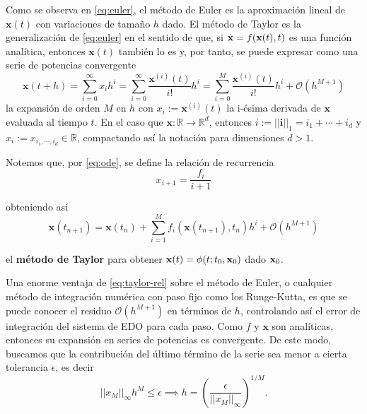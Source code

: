Como se observa en \ref{eq:euler}, el método de Euler es la aproximación lineal de $\mathbf{x}(t)$ con variaciones de tamaño $h$ dado. El método de Taylor es la generalización de \ref{eq:euler} en el sentido de que, si $\dot{\mathbf{x}} = f(\mathbf{x}(t),t)$ es una función analítica, entonces $\mathbf{x}(t)$ también lo es y, por tanto, se puede expresar como una serie de potencias convergente 
\begin{equation}
\mathbf{x}(t + h) = \sum_{i=0}^\infty x_i h^i = \sum_{i=0}^\infty \frac{\mathbf{x}^{(i)}(t)}{i!}h^i 
= \sum_{i=0}^M \frac{\mathbf{x}^{(i)}(t)}{i!}h^i + \mathcal{O}(h^{M+1})
\label{eq:anal-exp}
\end{equation}
la expansión de orden $M$ en $h$ con $x_i := \mathbf{x}^{(i)}(t)$ la i-ésima derivada de $\mathbf{x}$ evaluada al tiempo $t$. En el caso que $\mathbf{x}: \mathbb{R} \to \mathbb{R}^d$, entonces $i := ||\mathbf{i}||_1 = i_1 + \cdots + i_d$ y $x_i := x_{i_1,\cdots,i_d} \in \mathbb{R}$, compactando así la notación para dimensiones $d > 1$.

Notemos que, por \ref{eq:ode}, se define la relación de recurrencia
\begin{equation}
x_{i+1} = \frac{f_i}{i+1}
\label{eq:rec-rel}
\end{equation}

obteniendo así 
\begin{equation}
\mathbf{x}(t_{n+1}) = \mathbf{x}(t_n) + \sum_{i=1}^M f_i(\mathbf{x}(t_{n+1}),t_n)h^i + \mathcal{O}(h^{M+1})
\label{eq:taylor-rel}
\end{equation}

el \textbf{método de Taylor} para obtener $\mathbf{x}(t) = \phi(t;t_0,\mathbf{x}_0)$ dado $\mathbf{x}_0$.

Una enorme ventaja de \ref{eq:taylor-rel} sobre el método de Euler, o cualquier método de integración numérica con paso fijo como los Runge-Kutta, es que se puede conocer el residuo $\mathcal{O}(h^{M+1})$ en términos de $h$, controlando así el error de integración del sistema de EDO para cada paso. Como $f$ y $\mathbf{x}$ son analíticas, entonces su expansión en series de potencias es convergente. De este modo, buscamos que la contribución del último término de la serie sea menor a cierta tolerancia $\epsilon$, es decir
\begin{equation*}
||x_M||_\infty h^M \leq \epsilon \implies h = \left( \frac{\epsilon}{||x_M||_\infty} \right)^{1/M}.
\end{equation*} 

